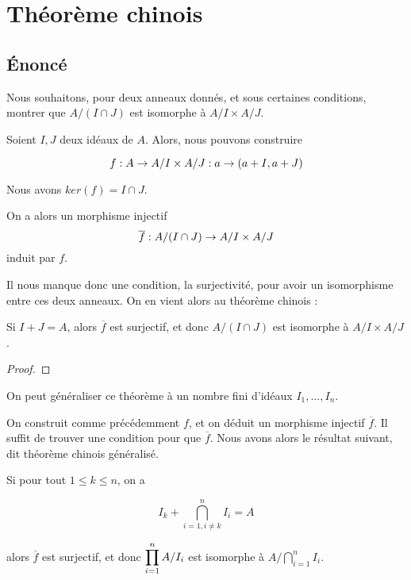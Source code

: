 \section{Théorème chinois}


\subsection{Énoncé}
Nous souhaitons, pour deux anneaux donnés, et sous certaines conditions, montrer
que $A/(I \cap J)$ est isomorphe à $A/I \times A/J$.

Soient $I, J$ deux idéaux de $A$. Alors, nous pouvons construire

\begin{equation}
	f : A \rightarrow A/I \times A/J : a \rightarrow (a + I, a + J)
\end{equation}

Nous avons $ker(f) = I \cap J$.

On a alors un morphisme injectif
\begin{equation}
	\overline{f} : A/(I \cap J) \rightarrow A/I \times A/J
\end{equation}
induit par $f$.

Il nous manque donc une condition, la surjectivité, pour avoir un isomorphisme
entre ces deux anneaux.
On en vient alors au théorème chinois :

\begin{theorem}
	Si $I + J = A$, alors $\overline{f}$ est surjectif, et donc $A/(I \cap
	J)$ est isomorphe à $A/I \times A/J$.
\end{theorem}

\ifdefined\outputproof
\begin{proof}

\end{proof}
\fi

On peut généraliser ce théorème à un nombre fini d'idéaux $I_{1}, \ldots,
I_{n}$.

On construit comme précédemment $f$, et on déduit un morphisme injectif
$\overline{f}$. Il suffit de trouver une condition pour que $\overline{f}$. Nous
avons alors le résultat suivant, dit théorème chinois généralisé.

\begin{theorem}
	Si pour tout $1 \leq k \leq n$, on a

	\begin{equation}
		I_{k} + \displaystyle \bigcap_{{i = 1, i \neq k}}^{n} I_{i} = A
	\end{equation}

	alors $\overline{f}$ est surjectif, et
	donc $\displaystyle \prod_{i = 1}^{n} A/I_{i}$ est isomorphe à $\displaystyle A/\bigcap_{i = 1}^{n}
	I_{i}$.
\end{theorem}

